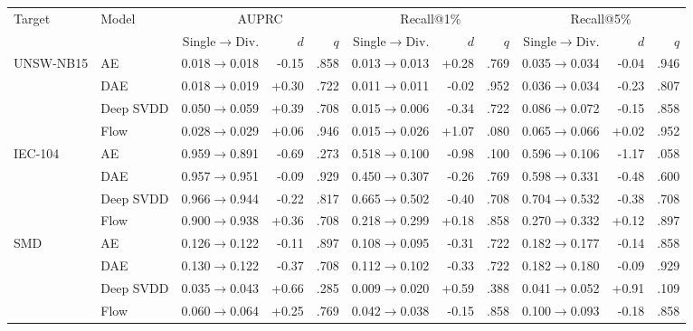 \begin{tabular}{llrrrrrrrrr}\toprule
Target & Model & \multicolumn{3}{c}{AUPRC} & \multicolumn{3}{c}{Recall@1\%} & \multicolumn{3}{c}{Recall@5\%}\\
\cmidrule(lr){3-5}\cmidrule(lr){6-8}\cmidrule(lr){9-11}
 & & Single$\to$Div. & $d$ & $q$ & Single$\to$Div. & $d$ & $q$ & Single$\to$Div. & $d$ & $q$\\
\midrule
UNSW-NB15 & AE & 0.018$\to$0.018 & -0.15 & .858 & 0.013$\to$0.013 & +0.28 & .769 & 0.035$\to$0.034 & -0.04 & .946\\
 & DAE & 0.018$\to$0.019 & +0.30 & .722 & 0.011$\to$0.011 & -0.02 & .952 & 0.036$\to$0.034 & -0.23 & .807\\
 & Deep SVDD & 0.050$\to$0.059 & +0.39 & .708 & 0.015$\to$0.006 & -0.34 & .722 & 0.086$\to$0.072 & -0.15 & .858\\
 & Flow & 0.028$\to$0.029 & +0.06 & .946 & 0.015$\to$0.026 & +1.07 & .080 & 0.065$\to$0.066 & +0.02 & .952\\
\midrule
IEC-104 & AE & 0.959$\to$0.891 & -0.69 & .273 & 0.518$\to$0.100 & -0.98 & .100 & 0.596$\to$0.106 & -1.17 & .058\\
 & DAE & 0.957$\to$0.951 & -0.09 & .929 & 0.450$\to$0.307 & -0.26 & .769 & 0.598$\to$0.331 & -0.48 & .600\\
 & Deep SVDD & 0.966$\to$0.944 & -0.22 & .817 & 0.665$\to$0.502 & -0.40 & .708 & 0.704$\to$0.532 & -0.38 & .708\\
 & Flow & 0.900$\to$0.938 & +0.36 & .708 & 0.218$\to$0.299 & +0.18 & .858 & 0.270$\to$0.332 & +0.12 & .897\\
\midrule
SMD & AE & 0.126$\to$0.122 & -0.11 & .897 & 0.108$\to$0.095 & -0.31 & .722 & 0.182$\to$0.177 & -0.14 & .858\\
 & DAE & 0.130$\to$0.122 & -0.37 & .708 & 0.112$\to$0.102 & -0.33 & .722 & 0.182$\to$0.180 & -0.09 & .929\\
 & Deep SVDD & 0.035$\to$0.043 & +0.66 & .285 & 0.009$\to$0.020 & +0.59 & .388 & 0.041$\to$0.052 & +0.91 & .109\\
 & Flow & 0.060$\to$0.064 & +0.25 & .769 & 0.042$\to$0.038 & -0.15 & .858 & 0.100$\to$0.093 & -0.18 & .858\\
\bottomrule
\end{tabular}